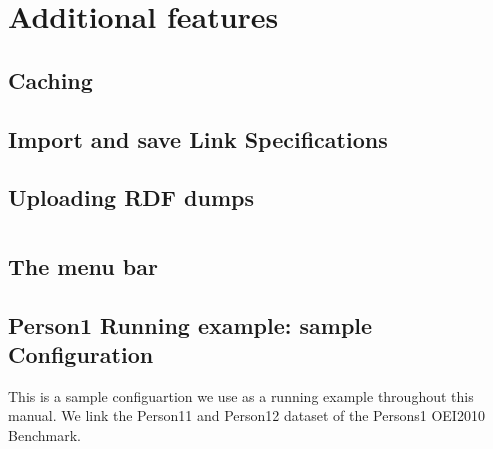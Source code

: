 \documentclass[oneside,a4paper,12pt]{memoir}
\begin{document}
\chapter{Additional features}
\label{features}

\section{Caching}
\label{caching}


\section{Import and save Link Specifications}
\label{ImportExport}

\section{Uploading RDF dumps}
\label{upload}




\newpage
\appendix
\chapter{}
\section{The menu bar}
\label{menuBar}


\section{Person1 Running example: sample Configuration}
\label{person1Spec}
This is a sample configuartion we use as a running example throughout this manual. We link the Person11 and Person12 dataset of the Persons1 OEI2010 Benchmark.\\
\lstset{language=XML}

\end{document}
